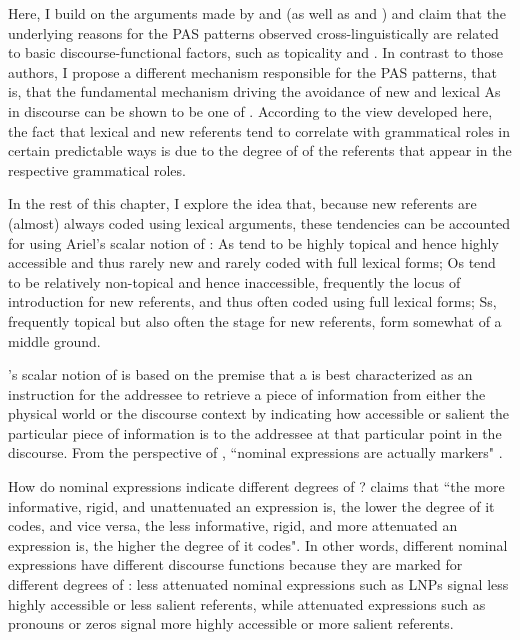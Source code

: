 Here, I build on the arguments made by \citet{haspelmath2006} and \citet{everett2009} (as well as \citet{haig2016} and \citet{schnell2017}) and claim that the underlying reasons for the PAS patterns observed cross-linguistically are related to basic discourse-functional factors, such as topicality and . In contrast to those authors, I propose a different mechanism responsible for the PAS patterns, that is, that the fundamental mechanism driving the avoidance of new and lexical As in discourse can be shown to be one of  \citep{ariel1990,ariel2001}. According to the view developed here, the fact that lexical and new referents tend to correlate with grammatical roles in certain predictable ways is due to the degree of  of the referents that appear in the respective grammatical roles.

In the rest of this chapter, I explore the idea that, because new referents are (almost) always coded using lexical arguments, these tendencies can be accounted for using Ariel's scalar notion of  \citep{ariel1990,ariel2001}: As tend to be highly topical and hence highly accessible and thus rarely new and rarely coded with full lexical forms; Os tend to be relatively non-topical and hence inaccessible, frequently the locus of introduction for new referents, and thus often coded using full lexical forms; Ss, frequently topical but also often the stage for new referents, form somewhat of a middle ground.

\citet{ariel1990,ariel2001}'s scalar notion of  is based on the premise that a  is best characterized as an instruction for the addressee to retrieve a piece of information from either the physical world or the discourse context by indicating how accessible or salient the particular piece of information is to the addressee at that particular point in the discourse. From the perspective of , ``nominal expressions are actually  markers" \citep[31]{ariel2001}. 

How do nominal expressions indicate different degrees of ? \citet[32]{ariel2001} claims that ``the more informative, rigid, and unattenuated an expression is, the lower the degree of  it codes, and vice versa, the less informative, rigid, and more attenuated an expression is, the higher the degree of  it codes". In other words, different nominal expressions have different discourse functions because they are marked for different degrees of : less attenuated nominal expressions such as LNPs signal less highly accessible or less salient referents, while attenuated expressions such as pronouns or zeros signal more highly accessible or more salient referents. 

